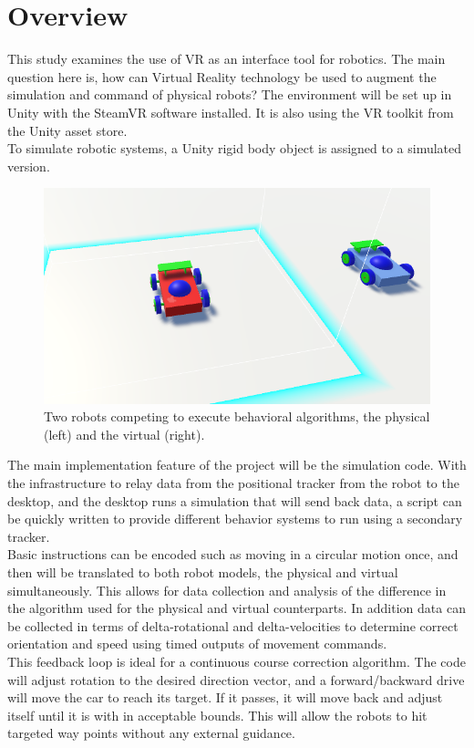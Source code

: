 \documentclass[10pt,a4paper]{article}
\begin{document}
	\section*{Overview}
	This study examines the use of VR as an interface tool for robotics. The main question here is, how can Virtual Reality technology be used to augment the simulation and command of physical robots? The environment will be set up in Unity with the SteamVR software installed. It is also using the VR toolkit from the Unity asset store.
	\\ 
	To simulate robotic systems, a Unity rigid body object is assigned to a simulated version. 		\begin{figure}[h]
		\centering
		\includegraphics[width=.4\textwidth]{robot-rivalry.png}
		\caption{Two robots competing to execute behavioral algorithms, the physical (left) and the virtual (right).}
		\label{fig:robot-rivalry}
	\end{figure}
	The main implementation feature of the project will be the simulation code. With the infrastructure to relay data from the positional tracker from the robot to the desktop, and the desktop runs a simulation that will send back data, a script can be quickly written to provide different behavior systems to run using a secondary tracker.
	\\ 
	Basic instructions can be encoded such as moving in a circular motion once, and then will be translated to both robot models, the physical and virtual simultaneously. This allows for data collection and analysis of the difference in the algorithm used for the physical and virtual counterparts. In addition data can be collected in terms of delta-rotational and delta-velocities to determine correct orientation and speed using timed outputs of movement commands.
	\\ 
	This feedback loop is ideal for a continuous course correction algorithm. The code will adjust rotation to the desired direction vector, and a forward/backward drive will move the car to reach its target. If it passes, it will move back and adjust itself until it is with in acceptable bounds. This will allow the robots to hit targeted way points without any external guidance.
	\\ 
\end{document}
